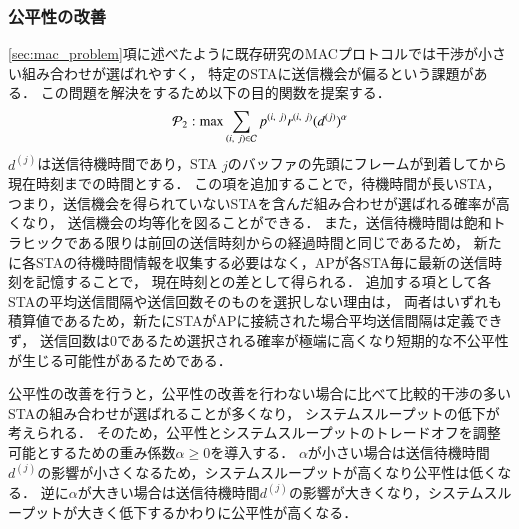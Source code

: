 \documentclass[master]{kuisthesis}		%
\begin{document}
		\subsubsection{公平性の改善}\label{sec:fair}
			\ref{sec:mac_problem}項に述べたように既存研究のMACプロトコルでは干渉が小さい組み合わせが選ばれやすく，
			特定のSTAに送信機会が偏るという課題がある．
			この問題を解決をするため以下の目的関数を提案する．
			\begin{equation}
				{\mathcal P}_2: {\rm max} \sum_{(i,\ j)\in{\mathcal C}} p^{(i,\ j)}r^{(i,\ j)}(d^{(j)})^{\alpha} 	\label{eq:p2}
			\end{equation}
			$d^{(j)}$は送信待機時間であり，STA $j$のバッファの先頭にフレームが到着してから現在時刻までの時間とする．
			この項を追加することで，待機時間が長いSTA，つまり，送信機会を得られていないSTAを含んだ組み合わせが選ばれる確率が高くなり，
			送信機会の均等化を図ることができる．
			また，送信待機時間は飽和トラヒックである限りは前回の送信時刻からの経過時間と同じであるため，
			新たに各STAの待機時間情報を収集する必要はなく，APが各STA毎に最新の送信時刻を記憶することで，
			現在時刻との差として得られる．
			追加する項として各STAの平均送信間隔や送信回数そのものを選択しない理由は，
			両者はいずれも積算値であるため，新たにSTAがAPに接続された場合平均送信間隔は定義できず，
			送信回数は0であるため選択される確率が極端に高くなり短期的な不公平性が生じる可能性があるためである．
			\par
			公平性の改善を行うと，公平性の改善を行わない場合に比べて比較的干渉の多いSTAの組み合わせが選ばれることが多くなり，
			システムスループットの低下が考えられる．
			そのため，公平性とシステムスループットのトレードオフを調整可能とするための重み係数$\alpha\geq 0$を導入する．
			$\alpha$が小さい場合は送信待機時間$d^{(j)}$の影響が小さくなるため，システムスループットが高くなり公平性は低くなる．
			逆に$\alpha$が大きい場合は送信待機時間$d^{(j)}$の影響が大きくなり，システムスループットが大きく低下するかわりに公平性が高くなる．
\end{document}
